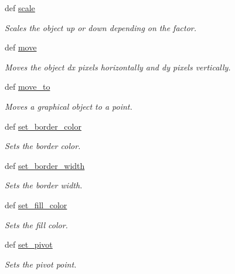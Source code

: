 \begin{DoxyCompactItemize}
def \hyperlink{classcs110graphics_1_1Fillable_a80d5b6b6d2ebae867dccecb803075749}{scale}
\begin{DoxyCompactList}\small\item\em Scales the object up or down depending on the factor. \item\end{DoxyCompactList}\item 
def \hyperlink{classcs110graphics_1_1Fillable_ae8f6c476e29c0810453dc16948e1730c}{move}
\begin{DoxyCompactList}\small\item\em Moves the object dx pixels horizontally and dy pixels vertically. \item\end{DoxyCompactList}\item 
def \hyperlink{classcs110graphics_1_1Fillable_adcabc14e76d1160ff591b9ef7f3d6a97}{move\_\-to}
\begin{DoxyCompactList}\small\item\em Moves a graphical object to a point. \item\end{DoxyCompactList}\item 
def \hyperlink{classcs110graphics_1_1Fillable_a2f830be5d970faac97759910d20d68a4}{set\_\-border\_\-color}
\begin{DoxyCompactList}\small\item\em Sets the border color. \item\end{DoxyCompactList}\item 
def \hyperlink{classcs110graphics_1_1Fillable_a09f05462cb2ed38fdccb244340f05b2b}{set\_\-border\_\-width}
\begin{DoxyCompactList}\small\item\em Sets the border width. \item\end{DoxyCompactList}\item 
def \hyperlink{classcs110graphics_1_1Fillable_a4f24c7186c8d057e42a0209eb1d56be7}{set\_\-fill\_\-color}
\begin{DoxyCompactList}\small\item\em Sets the fill color. \item\end{DoxyCompactList}\item 
def \hyperlink{classcs110graphics_1_1Fillable_a2a6066d1a11c0854ff5ee85e7d9ceb54}{set\_\-pivot}
\begin{DoxyCompactList}\small\item\em Sets the pivot point. \item\end{DoxyCompactList}\item 

\end{DoxyCompactItemize}
